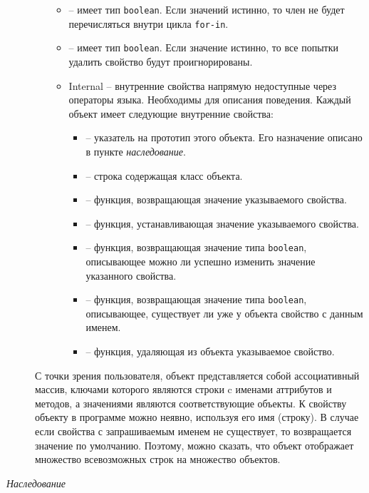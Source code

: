 \begin{description}
\begin{itemize}
\begin{itemize}
	  \item {}-- имеет тип \texttt{boolean}.
	    Если значений истинно, то член не будет перечисляться
	    внутри цикла \texttt{for-in}.

	  \item {} -- имеет тип \texttt{boolean}. Если
	    значение истинно, то все попытки удалить свойство будут
	    проигнорированы.

	  \item Internal -- внутренние свойства напрямую недоступные
	    через операторы языка. Необходимы для описания
	    поведения. Каждый объект имеет следующие внутренние
	    свойства:
	    \begin{itemize}
	      \item {} -- указатель на прототип этого
		объекта. Его назначение описано в пункте \emph{наследование}.
	      \item {} -- строка содержащая класс объекта.
	      \item {} -- функция, возвращающая значение
		указываемого свойства.
	      \item {} -- функция, устанавливающая значение
		указываемого свойства.
	      \item {} -- функция, возвращающая значение
		типа \texttt{boolean}, описывающее можно ли успешно
		изменить значение указанного свойства.
	      \item {} -- функция, возвращающая
		значение типа \texttt{boolean}, описывающее,
		существует ли уже у объекта свойство с данным именем.
	      \item {} -- функция, удаляющая из объекта
		указываемое свойство.
	    \end{itemize}
	\end{itemize}
    \end{itemize}
    С точки зрения пользователя, объект представляется собой
    ассоциативный массив, ключами которого являются строки c именами
    аттрибутов и методов, а значениями являются соответствующие
    объекты. К свойству объекту в программе можно неявно, используя
    его имя (строку). В случае если свойства с запрашиваемым именем не
    существует, то возвращается значение по умолчанию. Поэтому, можно
    сказать, что объект отображает множество всевозможных строк на
    множество объектов.
    \item[\emph{Наследование}]~\\  %

\end{description}
